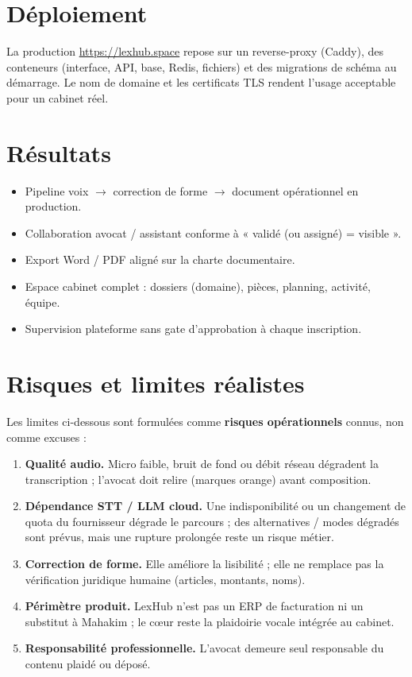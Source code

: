 \section{Déploiement}

La production \url{https://lexhub.space} repose sur un reverse-proxy (Caddy), des conteneurs (interface, API, base, Redis, fichiers) et des migrations de schéma au démarrage. Le nom de domaine et les certificats TLS rendent l'usage acceptable pour un cabinet réel.

\section{Résultats}

\begin{itemize}[leftmargin=1.4em]
  \item Pipeline voix $\rightarrow$ correction de forme $\rightarrow$ document opérationnel en production.
  \item Collaboration avocat / assistant conforme à « validé (ou assigné) = visible ».
  \item Export Word / PDF aligné sur la charte documentaire.
  \item Espace cabinet complet : dossiers (domaine), pièces, planning, activité, équipe.
  \item Supervision plateforme sans gate d'approbation à chaque inscription.
\end{itemize}

\section{Risques et limites réalistes}
\label{sec:limites}

Les limites ci-dessous sont formulées comme \textbf{risques opérationnels} connus, non comme excuses :

\begin{enumerate}[leftmargin=1.4em]
  \item \textbf{Qualité audio.} Micro faible, bruit de fond ou débit réseau dégradent la transcription ; l'avocat doit relire (marques orange) avant composition.
  \item \textbf{Dépendance STT / LLM cloud.} Une indisponibilité ou un changement de quota du fournisseur dégrade le parcours ; des alternatives / modes dégradés sont prévus, mais une rupture prolongée reste un risque métier.
  \item \textbf{Correction de forme.} Elle améliore la lisibilité ; elle ne remplace pas la vérification juridique humaine (articles, montants, noms).
  \item \textbf{Périmètre produit.} LexHub n'est pas un ERP de facturation ni un substitut à Mahakim ; le cœur reste la plaidoirie vocale intégrée au cabinet.
  \item \textbf{Responsabilité professionnelle.} L'avocat demeure seul responsable du contenu plaidé ou déposé.
\end{enumerate}
